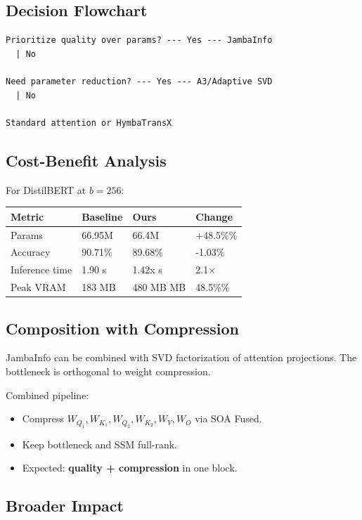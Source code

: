 \subsection{Decision Flowchart}

\begin{lstlisting}
Prioritize quality over params? --- Yes --- JambaInfo
  | No
   
Need parameter reduction? --- Yes --- A3/Adaptive SVD
  | No
   
Standard attention or HymbaTransX
\end{lstlisting}

\subsection{Cost-Benefit Analysis}

For DistilBERT at $b = 256$:

\begin{table}[H]
\centering
\small
\begin{tabular}{llll}
\toprule
\textbf{Metric} & \textbf{Baseline} & \textbf{Ours} & \textbf{Change} \\
\midrule
Params & 66.95M & 66.4M & +48.5\%\% \\
Accuracy & 90.71\% & 89.68\% & -1.03\% \\
Inference time & 1.90 s & 1.42x s & 2.1$\times$ \\
Peak VRAM & 183 MB & 480 MB MB & 48.5\%\% \\
\bottomrule
\end{tabular}
\end{table}

\subsection{Composition with Compression}

JambaInfo can be combined with SVD factorization of attention projections. 
The bottleneck is orthogonal to weight compression.

Combined pipeline:
\begin{itemize}
\item Compress $W_{Q_1}, W_{K_1}, W_{Q_2}, W_{K_2}, W_V, W_O$ via SOA Fused.
\item Keep bottleneck and SSM full-rank.
\item Expected: \textbf{quality + compression} in one block.

\end{itemize}
\subsection{Broader Impact}

